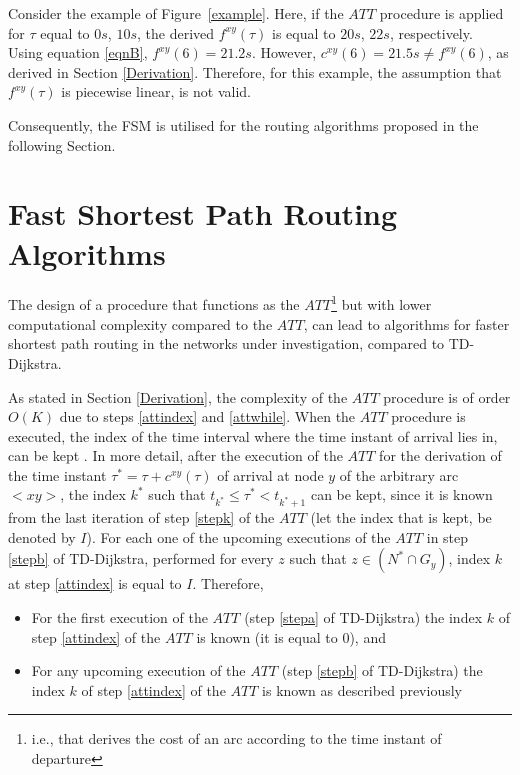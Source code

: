 \documentclass[conference]{IEEEtran}
\begin{document}
Consider the example of Figure~\ref{example}. Here, if the $ATT$ procedure is applied for $\tau$ equal to $0s$, $10s$, the derived $f^{xy}(\tau)$ is equal to $20s$, $22s$, respectively. Using equation \ref{eqnB}, $f^{xy}(6)=21.2s$. However, $c^{xy}(6)=21.5s \neq f^{xy}(6)$, as derived in Section \ref{Derivation}. Therefore, for this example, the assumption that  $f^{xy}(\tau)$ is piecewise linear, is not valid. 

Consequently, the FSM is utilised for the routing algorithms proposed in the following Section.

\section{Fast Shortest Path Routing Algorithms} \label{routing}

The design of a procedure that functions as the $ATT$\footnote{i.e., that derives the cost of an arc according to the time instant of departure} but with lower computational complexity compared to the $ATT$, can lead to algorithms for faster shortest path routing in the networks under investigation, compared to TD-Dijkstra. 

As stated in Section \ref{Derivation}, the complexity of the $ATT$ procedure is of order $O(K)$ due to steps \ref{attindex} and \ref{attwhile}. When the $ATT$ procedure is executed, the index of the time interval where the time instant of arrival lies in, can be kept \cite{Sung}. In more detail, after the execution of the $ATT$ for the derivation of the time instant $\tau^*=\tau+c^{xy}(\tau)$ of arrival at node $y$ of the arbitrary arc $<xy>$, the index $k^*$ such that $t_{k^*}\leq \tau^* <t_{k^*+1}$ can be kept, since it is known from the last iteration of step \ref{stepk} of the $ATT$ (let the index that is kept, be denoted by $I$). For each one of the upcoming executions of the $ATT$ in step \ref{stepb} of TD-Dijkstra, performed for every $z$ such that $z\in (N^*\cap G_y)$, index $k$ at step \ref{attindex} is equal to $I$. Therefore,

\begin{itemize}
    \item For the first execution of the $ATT$ (step \ref{stepa} of TD-Dijkstra) the index $k$ of step \ref{attindex} of the $ATT$ is known (it is equal to $0$), and
    \item For any upcoming execution of the $ATT$ (step \ref{stepb} of TD-Dijkstra) the index $k$ of step \ref{attindex} of the $ATT$ is known as described previously
\end{itemize}
\end{document}
